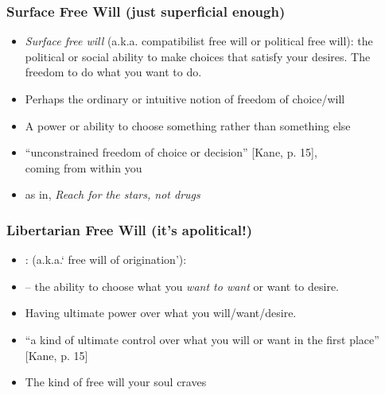 \begin{frame}
\frametitle{Surface Free Will (just superficial enough)}

\begin{itemize}[<+->]

\item \emph{Surface free will} (a.k.a. compatibilist free will or political free will): the political or social ability to make choices that satisfy your desires. The freedom to do what you want to do.
\item Perhaps the ordinary or intuitive notion of freedom of choice/will
\item A power or ability to choose something rather than something else
\item ``unconstrained freedom of choice or decision'' [Kane, p. 15], \\ coming from within you

\item as in, \textit{Reach for the stars, not drugs} 

\end{itemize}
\end{frame}

\begin{frame}
\frametitle{Libertarian Free Will (it's apolitical!)}

\begin{itemize}[<+->]

\item {}: (a.k.a.` free will of origination'): 
\item[] -- the ability to choose what you \textit{want to want} or want to desire. 
\item Having ultimate power over what you will/want/desire. %
\item ``a kind of ultimate control over what you will or want in the first place'' [Kane, p. 15]

\item The kind of free will your soul craves 


\end{itemize}
\end{frame}

